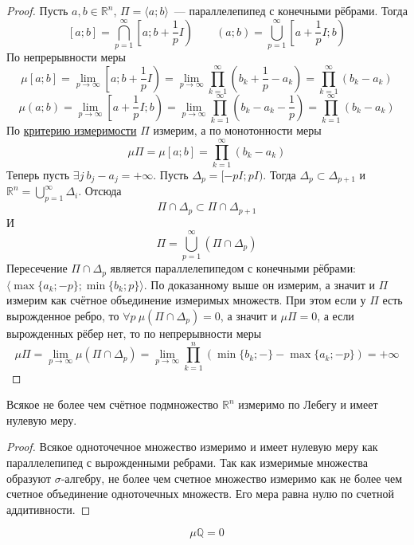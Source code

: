 \documentclass{article}
\begin{document}
    \begin{proof}
        Пусть $a,b\in\mathbb R^n$, $\Pi=\langle a;b\rangle$~--- параллелепипед с конечными рёбрами. Тогда
        $$
        [a;b]=\bigcap\limits_{p=1}^\infty\left[a;b+\frac1pI\right)\qquad(a;b)=\bigcup\limits_{p=1}^\infty\left[a+\frac1pI;b\right)
        $$
        По непрерывности меры
        $$
        \mu[a;b]=\lim\limits_{p\to\infty}\left[a;b+\frac1pI\right)=\lim\limits_{p\to\infty}\prod\limits_{k=1}^\infty\left(b_k+\frac1p-a_k\right)=\prod\limits_{k=1}^\infty\left(b_k-a_k\right)
        $$
        $$
        \mu(a;b)=\lim\limits_{p\to\infty}\left[a+\frac1pI;b\right)=\lim\limits_{p\to\infty}\prod\limits_{k=1}^\infty\left(b_k-a_k-\frac1p\right)=\prod\limits_{k=1}^\infty\left(b_k-a_k\right)
        $$
        По \hyperref[Критерий измеримости]{критерию измеримости} $\Pi$ измерим, а по монотонности меры
        $$
        \mu\Pi=\mu[a;b]=\prod\limits_{k=1}^\infty\left(b_k-a_k\right)
        $$
        Теперь пусть $\exists j~b_j-a_j=+\infty$. Пусть $\Delta_p=[-pI;pI)$. Тогда $\Delta_p\subset\Delta_{p+1}$ и $\mathbb R^n=\bigcup\limits_{p=1}^\infty\Delta_i$. Отсюда
        $$
        \Pi\cap\Delta_p\subset\Pi\cap\Delta_{p+1}
        $$
        И
        $$
        \Pi=\bigcup\limits_{p=1}^\infty(\Pi\cap\Delta_p)
        $$
        Пересечение $\Pi\cap\Delta_p$ является параллелепипедом с конечными рёбрами: $\langle\max\{a_k;-p\};\min\{b_k;p\}\rangle$. По доказанному выше он измерим, а значит и $\Pi$ измерим как счётное объединение измеримых множеств. При этом если у $\Pi$ есть вырожденное ребро, то $\forall p~\mu(\Pi\cap\Delta_p)=0$, а значит и $\mu\Pi=0$, а если вырожденных рёбер нет, то по непрерывности меры
        $$
        \mu\Pi=\lim\limits_{p\to\infty}\mu(\Pi\cap\Delta_p)=\lim\limits_{p\to\infty}\prod\limits_{k=1}^n(\min\{b_k;-\}-\max\{a_k;-p\})=+\infty
        $$
    \end{proof}
    \begin{corollary}
        Всякое не более чем счётное подмножество $\mathbb R^n$ измеримо по Лебегу и имеет нулевую меру.
    \end{corollary}
    \begin{proof}
        Всякое одноточечное множество измеримо и имеет нулевую меру как параллелепипед с вырожденными ребрами. Так как измеримые множества образуют $\sigma$-алгебру, не более чем счетное множество измеримо как не более чем счетное объединение одноточечных множеств. Его мера равна нулю по счетной аддитивности.
    \end{proof}
    \begin{corollary}
        $$\mu\mathbb Q=0$$
    \end{corollary}
\end{document}

